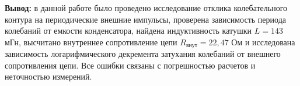 \documentclass[a4paper,12pt]{article} %
\begin{document}
\newpage

\textbf{Вывод:} в данной работе было проведено исследование отклика колебательного контура на периодические внешние импульсы, проверена зависимость периода колебаний от емкости конденсатора, найдена индуктивность катушки $L = 143$ мГн, высчитано внутреннее сопротивление цепи $R_{\text{внут}} = 22,47$ Ом и исследована зависимость логарифмического декремента затухания колебаний от внешнего сопротивления цепи. Все ошибки связаны с погрешностью расчетов и неточностью измерений. 
\end{document}
